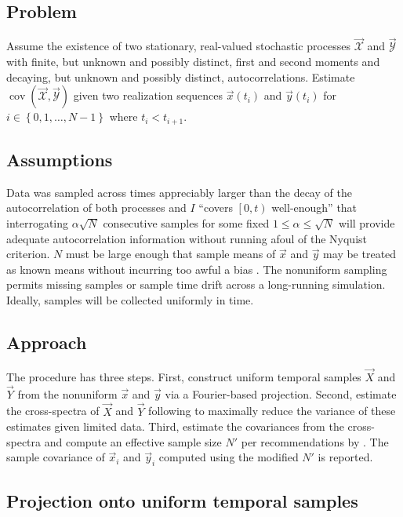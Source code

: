 \documentclass[letterpaper,11pt,nointlimits,reqno]{amsart}
\DeclareMathOperator{\cov}{cov}
\begin{document}
\subsection*{Problem}

Assume the existence of two stationary, real-valued stochastic processes
$\vec{\mathscr{X}}$ and $\vec{\mathscr{Y}}$ with finite, but unknown and
possibly distinct, first and second moments and decaying, but unknown and
possibly distinct, autocorrelations.  Estimate
$\cov\left(\vec{\mathscr{X}},\vec{\mathscr{Y}}\right)$ given two realization
sequences $\vec{x}\left(t_i\right)$ and $\vec{y}\left(t_i\right)$ for
$i\in\left\{0,1,\dots,N-1\right\}$ where $t_i < t_{i+1}$.

\subsection*{Assumptions}

Data was sampled across times appreciably larger than the decay of the
autocorrelation of both processes and $I$ ``covers $\left[0,t\right)$
well-enough'' that interrogating $\alpha \sqrt{N}$ consecutive samples for some
fixed $1\le\alpha\le\sqrt{N}$ will provide adequate autocorrelation information
without running afoul of the Nyquist criterion.  $N$ must be large enough that
sample means of $\vec{x}$ and $\vec{y}$ may be treated as known means without
incurring too awful a bias \citep[see][]{Percival1993Three}.  The nonuniform
sampling permits missing samples or sample time drift across a long-running
simulation.  Ideally, samples will be collected uniformly in time.

\subsection*{Approach}

The procedure has three steps.  First, construct uniform temporal samples
$\vec{X}$ and $\vec{Y}$ from the nonuniform $\vec{x}$ and $\vec{y}$ via a
Fourier-based projection.  Second, estimate the cross-spectra of $\vec{X}$ and
$\vec{Y}$ following \citet{Welch1967Use} to maximally reduce the variance of
these estimates given limited data.  Third, estimate the covariances from the
cross-spectra and compute an effective sample size $N'$ per recommendations by
\citet{Thiebaux1984Interpretation}.  The sample covariance of $\vec{x}_i$ and
$\vec{y}_i$ computed using the modified $N'$ is reported.

\subsection*{Projection onto uniform temporal samples}
\end{document}

